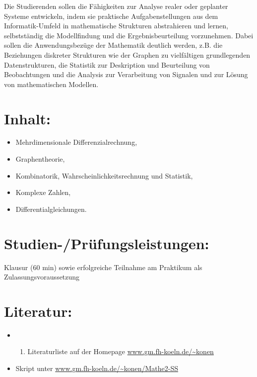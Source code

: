 Die Studierenden sollen die Fähigkeiten zur Analyse realer oder
geplanter Systeme entwickeln, indem sie praktische Aufgabenstellungen
aus dem Informatik-Umfeld in mathematische Strukturen abstrahieren und
lernen, selbstständig die Modellfindung und die Ergebnisbeurteilung
vorzunehmen. Dabei sollen die Anwendungsbezüge der Mathematik deutlich
werden, z.B. die Beziehungen diskreter Strukturen wie der Graphen zu
vielfältigen grundlegenden Datenstrukturen, die Statistik zur
Deskription und Beurteilung von Beobachtungen und die Analysis zur
Verarbeitung von Signalen und zur Lösung von mathematischen Modellen.

\section*{Inhalt:}\label{inhalt-14}

\begin{itemize}
\tightlist
\item
  Mehrdimensionale Differenzialrechnung,
\item
  Graphentheorie,
\item
  Kombinatorik, Wahrscheinlichkeitsrechnung und Statistik,
\item
  Komplexe Zahlen,
\item
  Differentialgleichungen.
\end{itemize}

\section*{Studien-/Prüfungsleistungen:}\label{studien-pruxfcfungsleistungen-12}

Klausur (60 min) sowie erfolgreiche Teilnahme am Praktikum als
Zulassungsvoraussetzung

\section*{Literatur:}\label{literatur-11}

\begin{itemize}
\tightlist
\item
  \begin{enumerate}
  \def\labelenumi{\alph{enumi}.}
  \setcounter{enumi}{18}
  \tightlist
  \item
    Literaturliste auf der Homepage \url{www.gm.fh-koeln.de/~konen}
  \end{enumerate}
\item
  Skript unter \url{www.gm.fh-koeln.de/~konen/Mathe2-SS}
\end{itemize}

